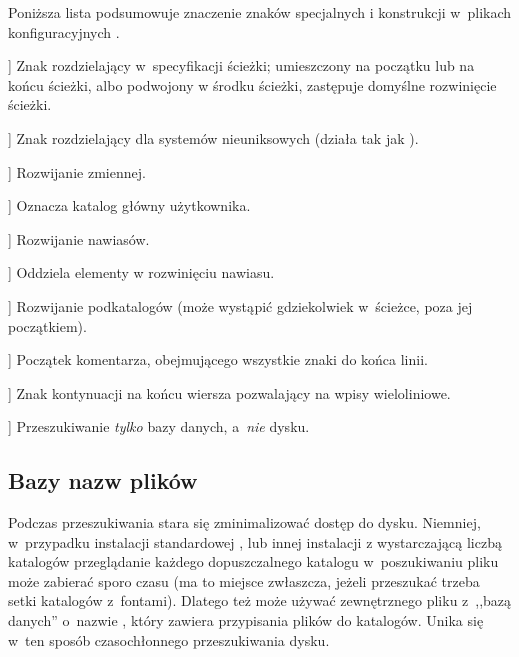 \documentclass{article}
\begin{document}
Poniższa lista podsumowuje znaczenie znaków specjalnych i konstrukcji w~plikach
konfiguracyjnych \KPS{}.

\newcommand{\CODE}[1]{\makebox[3em][l]{\code{#1}}}
\begin{ttdescription}
\item[\CODE{:}] Znak rozdzielający w~specyfikacji ścieżki; umieszczony na
 początku lub na końcu ścieżki, albo podwojony w środku ścieżki, zastępuje domyślne rozwinięcie ścieżki.\par
\item[\CODE{;}] Znak rozdzielający dla systemów nieuniksowych
 (działa tak jak \code{:}).
\item[\CODE{\$}] Rozwijanie zmiennej.
\item[\CODE{\string~}] Oznacza katalog główny użytkownika.
\item[\CODE{\char`\{\dots\char`\}}] Rozwijanie nawiasów.%
\item[\CODE{,}] Oddziela elementy w rozwinięciu nawiasu.%
\item[\CODE{//}] Rozwijanie podkatalogów (może wystąpić gdziekolwiek
 w~ścieżce, poza jej początkiem).
\item[\CODE{\%{\rm\ and }\#}] Początek komentarza, obejmującego wszystkie znaki do końca
 linii.
\item[\CODE{\bs}] Znak kontynuacji na końcu wiersza pozwalający na wpisy wieloliniowe.
\item[\CODE{!!}] Przeszukiwanie \emph{tylko} bazy danych,
         a~\emph{nie} dysku.
\end{ttdescription}

\subsection{Bazy nazw plików}
\label{sec:filename-database}

Podczas przeszukiwania \KPS{} stara się  zminimalizować dostęp do dysku.
Niemniej, w~przypadku instalacji standardowej \TL, lub innej instalacji z wystarczającą liczbą katalogów
przeglądanie każdego dopuszczalnego katalogu w~poszukiwaniu pliku może
zabierać sporo czasu (ma to miejsce zwłaszcza, jeżeli przeszukać trzeba setki
katalogów z~fontami).
Dlatego też \KPS{} może używać zewnętrznego pliku z~,,bazą danych''
o~nazwie , który zawiera przypisania plików do katalogów.
Unika się  w~ten sposób czasochłonnego przeszukiwania dysku.
\end{document}
